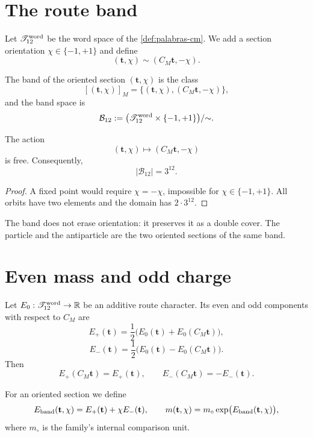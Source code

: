 \section{The route band}

Let \(\mathscr T_{12}^{\rm word}\) be the word space of the
\cref{def:palabras-cm}. We add a section orientation
\(\chi\in\{-1,+1\}\) and define
\[
(\mathbf t,\chi)\sim(C_M\mathbf t,-\chi).
\]

\begin{definition}
\label{def:banda-dodecafasica-ruta}
The band of the oriented section \((\mathbf t,\chi)\) is the class
\[
[(\mathbf t,\chi)]_M
=\{(\mathbf t,\chi),(C_M\mathbf t,-\chi)\},
\]
and the band space is
\[
\mathcal B_{12}
:=
\bigl(\mathscr T_{12}^{\rm word}\times\{-1,+1\}\bigr)/{\sim}.
\]
\end{definition}

\begin{proposition}
\label{prop:accion-cm-orientada-libre}
The action
\[
(\mathbf t,\chi)\longmapsto(C_M\mathbf t,-\chi)
\]
is free. Consequently,
\[
|\mathcal B_{12}|=3^{12}.
\]
\end{proposition}

\begin{proof}
A fixed point would require \(\chi=-\chi\), impossible for
\(\chi\in\{-1,+1\}\). All orbits have two elements and the domain
has \(2\cdot3^{12}\).
\end{proof}

The band does not erase orientation: it preserves it as a double cover. The
particle and the antiparticle are the two oriented sections of the same
band.

\section{Even mass and odd charge}

Let \(E_0:\mathscr T_{12}^{\rm word}\to\mathbb R\) be an additive route
character. Its even and odd components with respect to \(C_M\) are
\[
E_+(\mathbf t)
=\frac12\bigl(E_0(\mathbf t)+E_0(C_M\mathbf t)\bigr),
\]
\[
E_-(\mathbf t)
=\frac12\bigl(E_0(\mathbf t)-E_0(C_M\mathbf t)\bigr).
\]
Then
\[
E_+(C_M\mathbf t)=E_+(\mathbf t),
\qquad
E_-(C_M\mathbf t)=-E_-(\mathbf t).
\]

\begin{definition}
\label{def:caracter-banda}
For an oriented section we define
\[
E_{\rm band}(\mathbf t,\chi)
=E_+(\mathbf t)+\chi E_-(\mathbf t),
\qquad
m(\mathbf t,\chi)
=m_\circ\exp\bigl(E_{\rm band}(\mathbf t,\chi)\bigr),
\]
where \(m_\circ\) is the family's internal comparison unit.
\end{definition}

